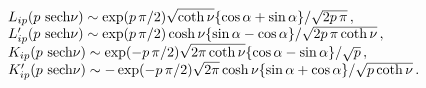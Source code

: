 \begin{equation}\label{p>x}\begin{array}{l} L_{ip}(p\,\,$sech$\nu)\sim \exp(p\,\pi /2)\sqrt{\coth\nu}\{\cos\alpha+
\sin\alpha\}/\sqrt{2p\,\pi}\,,\\
L'_{ip}(p\,\,$sech$\nu)\sim
\exp(p\,\pi/2)\cosh\nu\{\sin\alpha-\cos\alpha\}/\sqrt{2p\,\pi\coth\nu}\,,\\
K_{ip}(p\,\,$sech$\nu)\sim
\exp(-p\,\pi/2)\sqrt{2\pi\coth\nu}\{\cos\alpha-\sin\alpha\}/\sqrt{p}\,,\\K'_{ip}(p\,\,$sech$\nu)\sim
-\exp(-p\,\pi/2)\sqrt{2\pi}\cosh\nu\{\sin\alpha+\cos\alpha\}/\sqrt{p\coth\nu}\,.
\end{array}\end{equation}

